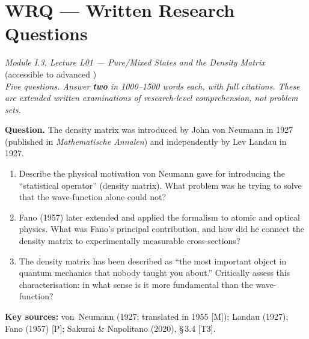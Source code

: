 \documentclass[11pt,a4paper]{article}
\begin{document}
\section*{WRQ --- Written Research Questions}
\begin{center}
  \textit{Module I.3, Lecture L01 --- Pure/Mixed States and the Density Matrix}\\[4pt]
   (accessible to advanced )\\[6pt]
  \textit{Five questions. Answer \textbf{two} in 1000--1500 words each,
  with full citations. These are extended written examinations of research-level
  comprehension, not problem sets.}
\end{center}

\bigskip

\begin{tcolorbox}[researchbox, title={WRQ 1 --- Historical and Conceptual: von Neumann's Statistical Operator}]

\textbf{Question.}
The density matrix was introduced by John von Neumann in 1927
(published in \textit{Mathematische Annalen}) and independently by Lev Landau in 1927.
\begin{enumerate}[leftmargin=1.8em, label=(\alph*), itemsep=6pt]
  \item Describe the physical motivation von Neumann gave for introducing the
        ``statistical operator'' (density matrix). What problem was he trying to solve
        that the wave-function alone could not?
  \item Fano (1957) later extended and applied the formalism to atomic and optical
        physics. What was Fano's principal contribution, and how did he connect
        the density matrix to experimentally measurable cross-sections?
  \item The density matrix has been described as ``the most important object in
        quantum mechanics that nobody taught you about.''
        Critically assess this characterisation: in what sense is it more
        fundamental than the wave-function?
\end{enumerate}

\medskip\textbf{Key sources:} von~Neumann (1927; translated in 1955 [M]);
Landau (1927); Fano (1957) [P]; Sakurai \& Napolitano (2020), \S\,3.4 [T3].
\end{tcolorbox}
\end{document}
